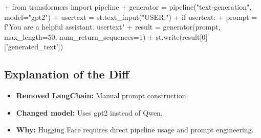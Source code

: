 \documentclass[11pt, a4paper]{article}
\begin{document}
\begin{addedcode}
\begin{diffverb}
+ from transformers import pipeline
+ generator = pipeline("text-generation", model="gpt2")
+ usertext = st.text_input("USER:")
+ if usertext:
+     prompt = f"You are a helpful assistant. {usertext}"
+     result = generator(prompt, max_length=50, num_return_sequences=1)
+     st.write(result[0]['generated_text'])
\end{diffverb}
\end{addedcode}


\subsection{Explanation of the Diff}
\begin{itemize}
    \item \textbf{Removed LangChain:} Manual prompt construction.
    \item \textbf{Changed model:} Uses gpt2 instead of Qwen.
    \item \textbf{Why:} Hugging Face requires direct pipeline usage and prompt engineering.
\end{itemize}


\newpage
\end{document}
